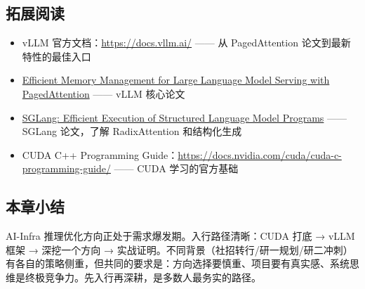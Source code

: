 \documentclass[a4paper]{article}
\begin{document}
\subsection{拓展阅读}

\begin{itemize}
  \item vLLM 官方文档：\href{https://docs.vllm.ai/}{https://docs.vllm.ai/} —— 从 PagedAttention 论文到最新特性的最佳入口
  \item \href{https://arxiv.org/abs/2309.06180}{Efficient Memory Management for Large Language Model Serving with PagedAttention} —— vLLM 核心论文
  \item \href{https://arxiv.org/abs/2312.07104}{SGLang: Efficient Execution of Structured Language Model Programs} —— SGLang 论文，了解 RadixAttention 和结构化生成
  \item CUDA C++ Programming Guide：\href{https://docs.nvidia.com/cuda/cuda-c-programming-guide/}{https://docs.nvidia.com/cuda/cuda-c-programming-guide/} —— CUDA 学习的官方基础
\end{itemize}

\subsection{本章小结}

AI-Infra 推理优化方向正处于需求爆发期。入行路径清晰：CUDA 打底 → vLLM 框架 → 深挖一个方向 → 实战证明。不同背景（社招转行/研一规划/研二冲刺）有各自的策略侧重，但共同的要求是：方向选择要慎重、项目要有真实感、系统思维是终极竞争力。先入行再深耕，是多数人最务实的路径。
\end{document}

